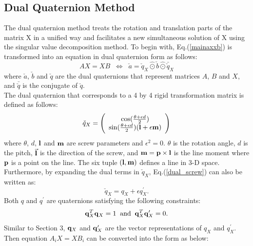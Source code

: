 \documentclass[twocolumn,10pt]{asme2ej}
\begin{document}
\subsection{Dual Quaternion Method }
The dual quaternion method \cite{daniilidis1999hand} treats the rotation and translation parts of the matrix X in a unified way and facilitates a new simultaneous solution of X using the singular value decomposition method. To begin with, Eq.(\ref{mainaxxb}) is transformed into an equation in dual quaternion form as follows:
\begin{equation}
AX = XB 
\; \;
\Leftrightarrow
\; \;
\check{a} = \check{q}_{X}\hat{\odot}\check{b}\hat{\odot}\bar{\check{q}}_{X}
\label{DualQuaternion}
\end{equation}
where $\check{a}$, $\check{b}$ and $\check{q}$ are the dual quaternions that represent matrices $A$, $B$ and $X$, and $\bar{\check{q}}$ is the conjugate of $\check{q}$.\\
The dual quaternion that corresponds to a 4 by 4 rigid transformation matrix is defined as follows:
\begin{equation}
\check{q}_{X} =
\Bigg( 
\begin{array}{c}
\cos(\frac{\theta + \epsilon d}{2})\\
\sin(\frac{\theta + \epsilon d}{2})({\bf l} + \epsilon {\bf m})
\end{array}
\Bigg)
\label{dual_screw}
\end{equation}
where
$\theta$, $d$, ${\bf l}$ and ${\bf m}$ are screw parameters and ${\epsilon}^{2} = 0$. $\theta$ is the rotation angle, $d$ is the pitch, $\vec{\bf l}$ is the direction of the screw, and ${\bf m} = {\bf p} \times {\bf l}$ is the line moment where ${\bf p}$ is a point on the line. The six tuple $({\bf l}, {\bf m})$ defines a line in 3-D space. Furthermore, by expanding the dual terms in $\check{q}_{X}$, Eq.(\ref{dual_screw}) can also be written as:
\begin{equation}
\check{q}_{X} = q_{X} + \epsilon {q}^{\prime}_{X}.
\end{equation} 
Both $q$ and $q^{\prime}$ are quaternions satisfying the following constraints:
\begin{equation}
{\bf q}^{T}_{X}{\bf q}_{X} = 1 \; \; \text{and} \;
\; {\bf q}^{T}_{X}{\bf q}^{\prime}_{X} = 0.
\end{equation}
Similar to Section 3, ${\bf q}_{X}$ and ${\bf q}^{\prime}_{X}$ are the vector representations of $q_{X}$ and $q^{\prime}_{X}$.
Then equation $A_{i}X = XB_{i}$ can be converted into the form as below:
\end{document}
